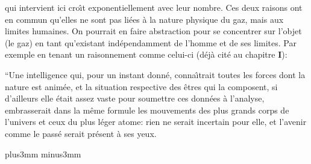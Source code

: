 qui intervient ici cro{\^\i}t exponentiellement avec leur nombre. 
\medskip
Ces deux raisons ont en commun qu'elles ne sont pas li\'ees \`a la nature
physique du gaz, mais aux limites humaines. On pourrait en faire abstraction
pour se concentrer sur l'objet (le gaz) en tant qu'existant ind\'ependamment
de l'homme et de ses limites. Par exemple en tenant un raisonnement comme
celui-ci (d\'ej\`a cit\'e au chapitre {\bf I}):
\medskip
{\cit ``Une intelligence qui, pour un instant donn\'e, conna{\^\i}trait
toutes les forces dont la nature est anim\'ee, et la situation respective 
des \^etres qui la composent, si d'ailleurs elle \'etait assez vaste pour 
soumettre ces donn\'ees \`a l'analyse, embrasserait dans la m\^eme formule 
les mouvements des plus grands corps de l'univers et ceux du plus l\'eger 
atome: rien ne serait incertain pour elle, et l'avenir comme le pass\'e 
serait pr\'esent \`a ses yeux. 
\smallskip
{}
\par}

\vskip6mm plus3mm minus3mm

